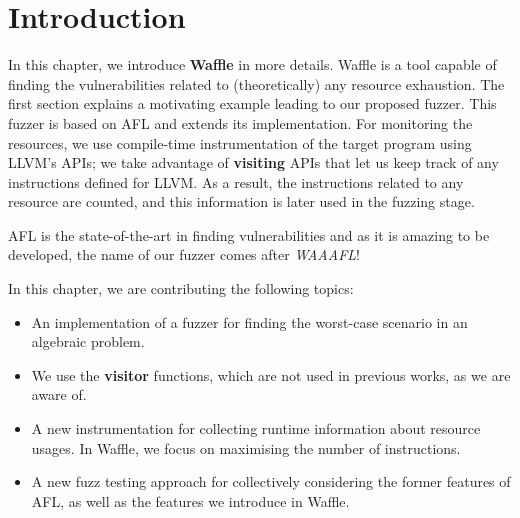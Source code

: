 \section{Introduction}
In this chapter, we introduce \textbf{Waffle} in more details. Waffle is a tool capable of finding the vulnerabilities related to (theoretically) any resource exhaustion. The first section explains a motivating example leading to our proposed fuzzer. This fuzzer is based on AFL and extends its implementation. For monitoring the resources, we use compile-time instrumentation of the target program using LLVM's APIs; we take advantage of \textbf{visiting} APIs that let us keep track of any instructions defined for LLVM. As a result, the instructions related to any resource are counted, and this information is later used in the fuzzing stage.

AFL is the state-of-the-art in finding vulnerabilities and as it is amazing to be developed, the name of our fuzzer comes after \textit{WAAAFL}!

\vspace{\baselineskip}

In this chapter, we are contributing the following topics:

\begin{itemize}
    \item An implementation of a fuzzer for finding the worst-case scenario in an algebraic problem.
    \item We use the \textbf{visitor} functions, which are not used in previous works, as we are aware of.
    \item A new instrumentation for collecting runtime information about resource usages. In Waffle, we focus on maximising the number of instructions.
    \item A new fuzz testing approach for collectively considering the former features of AFL, as well as the features we introduce in Waffle.
\end{itemize}
